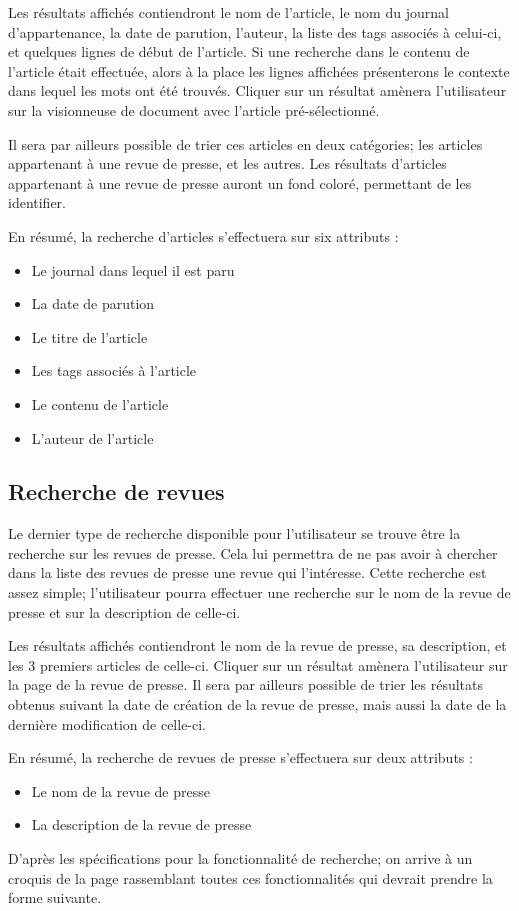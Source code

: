 Les résultats affichés contiendront le nom de l'article, le nom du journal d'appartenance, la date de parution, l'auteur, la liste des tags associés à celui-ci, et quelques lignes de début de l'article. Si une recherche dans le contenu de l'article était effectuée, alors à la place les lignes affichées présenterons le contexte dans lequel les mots ont été trouvés. Cliquer sur un résultat amènera l'utilisateur sur la visionneuse de document avec l'article pré-sélectionné.

Il sera par ailleurs possible de trier ces articles en deux catégories; les articles appartenant à une revue de presse, et les autres. Les résultats d'articles appartenant à une revue de presse auront un fond coloré, permettant de les identifier.

En résumé, la recherche d'articles s'effectuera sur six attributs :
\begin{itemize}
	\item Le journal dans lequel il est paru
	\item La date de parution
	\item Le titre de l'article
	\item Les tags associés à l'article
	\item Le contenu de l'article
	\item L'auteur de l'article
\end{itemize}

\subsection{Recherche de revues}
\label{sec:recherche_revue}

Le dernier type de recherche disponible pour l'utilisateur se trouve être la recherche sur les revues de presse. Cela lui permettra de ne pas avoir à chercher dans la liste des revues de presse une revue qui l'intéresse. Cette recherche est assez simple; l'utilisateur pourra effectuer une recherche sur le nom de la revue de presse et sur la description de celle-ci.

Les résultats affichés contiendront le nom de la revue de presse, sa description, et les 3 premiers articles de celle-ci. Cliquer sur un résultat amènera l'utilisateur sur la page de la revue de presse. Il sera par ailleurs possible de trier les résultats obtenus suivant la date de création de la revue de presse, mais aussi la date de la dernière modification de celle-ci.

En résumé, la recherche de revues de presse s'effectuera sur deux attributs :
\begin{itemize}
	\item Le nom de la revue de presse
	\item La description de la revue de presse
\end{itemize}
\bigskip
\par
D'après les spécifications pour la fonctionnalité de recherche; on arrive à un croquis de la page rassemblant toutes ces fonctionnalités qui devrait prendre la forme suivante.

